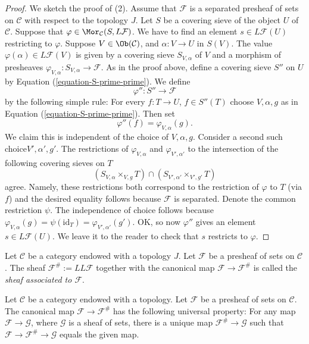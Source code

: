 \begin{proof}
\medskip\noindent
We sketch the proof of (2). Assume that $\mathcal{F}$ is a
separated presheaf of sets on $\mathcal{C}$ with respect to
the topology $J$.
Let $S$ be a covering sieve of the object $U$ of $\mathcal{C}$.
Suppose that $\varphi \in \Mor_\mathcal{C}(S, L\mathcal{F})$.
We have to find an element $s \in L\mathcal{F}(U)$ restricting
to $\varphi$. Suppose $V\in \Ob(\mathcal{C})$, and
$\alpha : V \to U$ in $S(V)$. The value $\varphi(\alpha)
\in L\mathcal{F}(V)$ is given by a covering sieve
$S_{V, \alpha}$ of $V$ and a morphism of presheaves
$\varphi_{V, \alpha} : S_{V, \alpha} \to \mathcal{F}$.
As in the proof above, define a covering sieve $S''$ on $U$ by
Equation (\ref{equation-S-prime-prime}). We define
$$
\varphi'' : S'' \longrightarrow \mathcal{F}
$$
by the following simple rule: For every $f : T \to U$,
$f \in S''(T)$ choose $V, \alpha, g$ as in
Equation (\ref{equation-S-prime-prime}). Then set
$$
\varphi''(f) = \varphi_{V, \alpha}(g).
$$
We claim this is independent of the
choice of $V, \alpha, g$.
Consider a second such choice$ V', \alpha', g'$.
The restrictions of $\varphi_{V, \alpha}$ and
$\varphi_{V', \alpha'}$ to the intersection
of the following covering sieves on $T$
$$
(S_{V, \alpha} \times_{V, g} T) \cap (S_{V', \alpha'} \times_{V', g'} T)
$$
agree. Namely, these restrictions both correspond to the
restriction of $\varphi$ to $T$ (via $f$) and the desired
equality follows because $\mathcal{F}$ is separated.
Denote the common restriction $\psi$.
The independence of choice follows because
$\varphi_{V, \alpha}(g) = \psi(\text{id}_T) =
\varphi_{V', \alpha'}(g')$. OK, so now $\varphi''$
gives an element $s \in L\mathcal{F}(U)$. We leave it to
the reader to check that $s$ restricts to $\varphi$.
\end{proof}

\begin{definition}
\label{definition-associated-sheaf-topology}
Let $\mathcal{C}$ be a category endowed with a topology $J$.
Let $\mathcal{F}$ be a presheaf of sets on $\mathcal{C}$.
The sheaf $\mathcal{F}^\# := LL\mathcal{F}$
together with the canonical map $\mathcal{F} \to \mathcal{F}^\#$
is called the {\it sheaf associated to $\mathcal{F}$}.
\end{definition}

\begin{proposition}
\label{proposition-sheafification-adjoint-topology}
Let $\mathcal{C}$ be a category endowed with a topology.
Let $\mathcal{F}$ be a presheaf of sets on $\mathcal{C}$.
The canonical map $\mathcal{F} \to \mathcal{F}^\#$ has the
following universal property: For any map
$\mathcal{F} \to \mathcal{G}$,
where $\mathcal{G}$ is a sheaf of sets, there is a unique map
$\mathcal{F}^\# \to \mathcal{G}$ such that $\mathcal{F} \to \mathcal{F}^\#
\to \mathcal{G}$ equals the given map.
\end{proposition}

